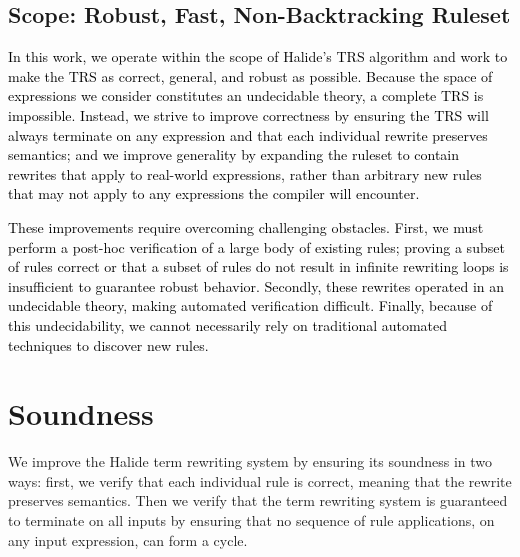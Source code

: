 \documentclass[acmsmall,review]{acmart}\settopmatter{printfolios=true,printccs=false,printacmref=false}
\newcommand{\sak}[1]{\textcolor{olive}{\textit{[{#1} --SK]}}}
\newcommand{\modified}[1]{\textcolor{black}{{#1}}}
\begin{document}
\subsection{Scope: Robust, Fast, Non-Backtracking Ruleset}
\modified{In this work, we operate within the scope of Halide's TRS algorithm
  and work to make the TRS as correct, general, and robust as possible.  Because
  the space of expressions we consider constitutes an undecidable theory, a complete
  TRS is impossible.  Instead, we strive to improve correctness by ensuring the TRS
  will always terminate on any expression and that each individual rewrite
  preserves semantics; and we improve generality by expanding the ruleset to
  contain rewrites that apply to real-world expressions, rather than
  arbitrary new rules that may not apply to any expressions the compiler will encounter.}

\modified{These improvements require overcoming challenging obstacles.  First,
  we must perform a post-hoc verification of a large body of existing rules;
  proving a subset of rules correct or that a subset of rules do not result in infinite
  rewriting loops is insufficient to guarantee robust behavior.  Secondly,
  these rewrites operated in an undecidable theory, making automated verification
  difficult.  Finally, because of this undecidability, we cannot necessarily
  rely on traditional automated techniques to discover new rules.}

\section{Soundness}
\label{sec:soundness}

We improve the Halide term rewriting system by ensuring its soundness in
two ways: first, we verify that each individual rule is correct, meaning that the
rewrite preserves semantics. Then we verify that the term rewriting system is
guaranteed to terminate on all inputs by ensuring that no sequence of
rule applications, on any input expression, can form a cycle.
\end{document}
